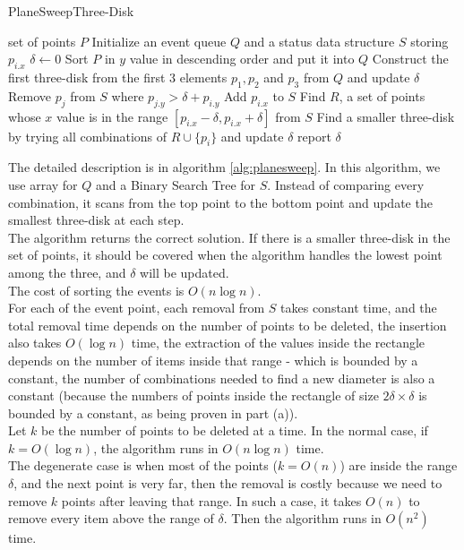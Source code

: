 \begin{algorithm}[h]
  \caption{PlaneSweepThree-Disk}
  \label{alg:planesweep}
  \begin{algorithmic}
      \Require set of points $P$
      \State Initialize an event queue $Q$ and a status data structure $S$ storing $p_{i.x}$ 
      \State $\delta \leftarrow 0$
      \State Sort $P$ in $y$ value in descending order and put it into $Q$
      \State Construct the first three-disk from the first 3 elements $p_1, p_2$ and $p_3$ from $Q$ and update $\delta$
	\State Remove $p_j$ from $S$ where  $ p_{j.y} > \delta + p_{i.y} $
	\State Add $p_{i.x}$ to $S$
	\State Find $R$, a set of points whose $x$ value is in the range  $[ p_{i.x} - \delta,  p_{i.x} + \delta ]$ from $S$
	\State Find a smaller three-disk by trying all combinations of $R \cup \{p_i\}$ and update $\delta$
	\EndIf
      \EndFor
      \State report $\delta$
\end{algorithmic}
\end{algorithm}

The detailed description is in algorithm \ref{alg:planesweep}. In this algorithm, we use array for $Q$ and a Binary Search Tree for $S$. Instead of comparing every combination, it scans from the top point to the bottom point and update the smallest three-disk at each step. \\

The algorithm returns the correct solution. If there is a smaller three-disk in the set of points, it should be covered when the algorithm handles the lowest point among the three, and $\delta$ will be updated.\\

The cost of sorting the events is $O(n\log n)$. \\

For each of the event point, each removal from $S$ takes constant time, and the total removal time depends on the number of points to be deleted, the insertion also takes $O(\log n)$ time, the extraction of the values inside the rectangle depends on the number of items inside that range - which is bounded by a constant, the number of combinations needed to find a new diameter is also a constant (because the numbers of points inside the rectangle of size $2 \delta \times \delta$ is bounded by a constant, as being proven in part (a)).\\

Let $k$ be the number of points to be deleted at a time. In the normal case, if $k = O(\log n)$, the algorithm runs in $O(n \log n)$ time. \\

The degenerate case is when most of the points ($k = O(n)$) are inside the range $\delta$, and the next point is very far, then the removal is costly because we need to remove $k$ points after leaving that range. In such a case, it takes $O(n)$ to remove every item above the range of $\delta$. Then the algorithm runs in $O(n^2)$ time.\\
